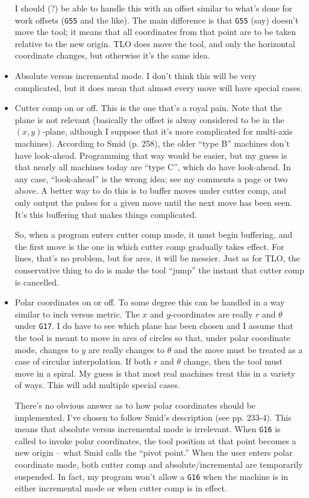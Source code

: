 \documentclass[titlepage,oneside,10pt]{article}
\begin{document}
\begin{itemize}
  I should (?) be able to handle this with an offset similar to what's
  done for work offsets ({\tt G55} and the like). The main difference
  is that {\tt G55} (say) doesn't move the tool; it means that all
  coordinates from that point are to be taken relative to the new
  origin. TLO does move the tool, and only the horizontal coordinate
  changes, but otherwise it's the same idea.
\item Absolute versus incremental mode. I don't think this will be
  very complicated, but it does mean that almost every move will have
  special cases.
\item Cutter comp on or off. This is the one that's a royal pain. Note
  that the plane is not relevant (basically the offset is alway
  considered to be in the $(x,y)$-plane, although I suppose that it's
  more complicated for multi-axis machines). According to Smid
  (p. 258), the older ``type B'' machines don't have
  look-ahead. Programming that way would be easier, but my guess is
  that nearly all machines today are ``type C'', which do have
  look-ahead. In any case, ``look-ahead'' is the wrong idea; see my
  comments a page or two above. A better way to do this is to buffer
  moves under cutter comp, and only output the pulses for a given move
  until the next move has been seen. It's this buffering that makes
  things complicated.
  
  So, when a program enters cutter comp mode, it must begin buffering,
  and the first move is the one in which cutter comp gradually takes
  effect. For lines, that's no problem, but for arcs, it will be
  messier. Just as for TLO, the conservative thing to do is make the
  tool ``jump'' the instant that cutter comp is cancelled.
\item Polar coordinates on or off. To some degree this can be
  handled in a way similar to inch versus metric. The $x$ and
  $y$-coordinates are really $r$ and $\theta$ under {\tt G17}. I do
  have to see which plane has been chosen and I assume that the tool
  is meant to move in arcs of circles so that, under polar coordinate
  mode, changes to $y$ are really changes to $\theta$ and the move
  must be treated as a case of circular interpolation. If both $r$ and
  $\theta$ change, then the tool must move in a spiral. My guess is
  that most real machines treat this in a variety of ways. This will
  add multiple special cases.
  
  There's no obvious answer as to how polar coordinates should be
  implemented. I've chosen to follow Smid's description (see
  pp. 233-4). This means that absolute versus incremental mode is
  irrelevant. When {\tt G16} is called to invoke polar coordinates,
  the tool position at that point becomes a new origin -- what Smid
  calls the ``pivot point.'' When the user enters polar coordinate
  mode, both cutter comp and absolute/incremental are temporarily
  suspended. In fact, my program won't allow a {\tt G16} when the
  machine is in either incremental mode or when cutter comp is in effect.
\end{itemize}
\end{document}
